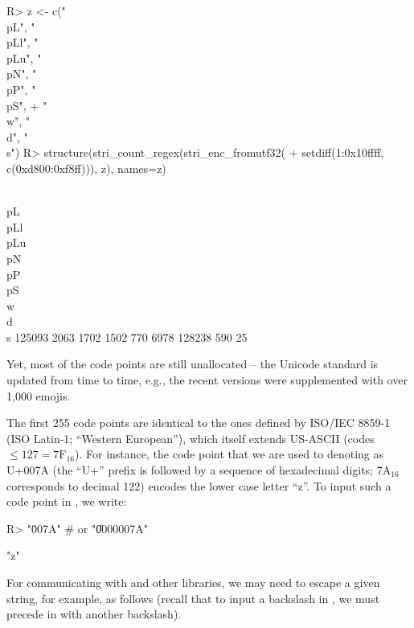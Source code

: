 \documentclass[nojss]{jss}
\begin{document}
\begin{Schunk}
\begin{Sinput}
R> z <- c("\\p{L}", "\\p{Ll}", "\\p{Lu}", "\\p{N}", "\\p{P}", "\\p{S}",
+    "\\w", "\\d", "\\s")
R> structure(stri_count_regex(stri_enc_fromutf32(
+    setdiff(1:0x10ffff, c(0xd800:0xf8ff))), z), names=z)
\end{Sinput}
\begin{Soutput}
 \\p{L} \\p{Ll} \\p{Lu}  \\p{N}  \\p{P}  \\p{S}     \\w     \\d     \\s
 125093    2063    1702    1502     770    6978  128238     590      25
\end{Soutput}
\end{Schunk}

Yet, most of the code points are still unallocated -- the Unicode
standard is updated from time to time, e.g., the recent versions
were supplemented with over 1{,}000 emojis.


The first 255 code points are identical to the ones defined
by ISO/IEC 8859-1 (ISO Latin-1;
``Western European''), which itself extends US-ASCII (codes $\le 127=\text{7F}{}_{16}$).
For instance, the code point that we are used to denoting as U+007A
(the ``U+'' prefix is followed by a sequence of hexadecimal digits;
7A${}_{16}$ corresponds to decimal 122) encodes the lower case letter ``z''.
To input such a code point in , we write:

\begin{Schunk}
\begin{Sinput}
R> "\u007A"  # or "\U0000007A"
\end{Sinput}
\begin{Soutput}
[1] "z"
\end{Soutput}
\end{Schunk}


For communicating with  and other libraries,
we may need to escape a given string, for example, as follows
(recall that to input a backslash in ,
we must precede in with another backslash).
\end{document}
